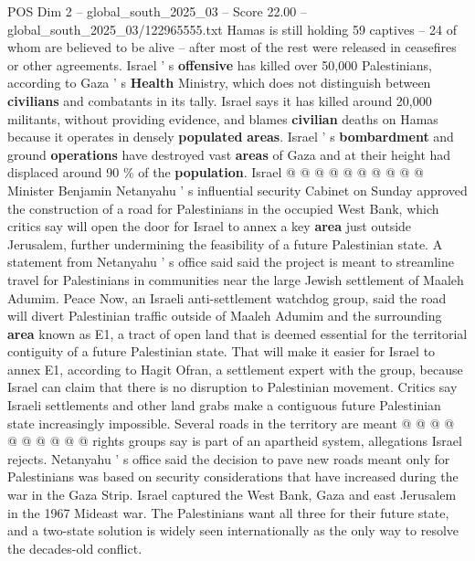\begin{textsample}{POS Dim 2 – global\_south\_2025\_03 – Score 22.00 – global\_south\_2025\_03/122965555.txt}
Hamas is still holding 59 captives -- 24 of whom are believed to be alive -- after most of the rest were released in ceasefires or other agreements.
Israel ' s \textbf{offensive} has killed over 50,000 Palestinians, according to Gaza ' s \textbf{Health} Ministry, which does not distinguish between \textbf{civilians} and combatants in its tally.
Israel says it has killed around 20,000 militants, without providing evidence, and blames \textbf{civilian} deaths on Hamas because it operates in densely \textbf{populated} \textbf{areas}.
Israel ' s \textbf{bombardment} and ground \textbf{operations} have destroyed vast \textbf{areas} of Gaza and at their height had displaced around 90 \% of the \textbf{population}.
Israel @ @ @ @ @ @ @ @ @ @ Minister Benjamin Netanyahu ' s influential security Cabinet on Sunday approved the construction of a road for Palestinians in the occupied West Bank, which critics say will open the door for Israel to annex a key \textbf{area} just outside Jerusalem, further undermining the feasibility of a future Palestinian state.
A statement from Netanyahu ' s office said said the project is meant to streamline travel for Palestinians in communities near the large Jewish settlement of Maaleh Adumim.
Peace Now, an Israeli anti-settlement watchdog group, said the road will divert Palestinian traffic outside of Maaleh Adumim and the surrounding \textbf{area} known as E1, a tract of open land that is deemed essential for the territorial contiguity of a future Palestinian state.
That will make it easier for Israel to annex E1, according to Hagit Ofran, a settlement expert with the group, because Israel can claim that there is no disruption to Palestinian movement.
Critics say Israeli settlements and other land grabs make a contiguous future Palestinian state increasingly impossible.
Several roads in the territory are meant @ @ @ @ @ @ @ @ @ @ rights groups say is part of an apartheid system, allegations Israel rejects.
Netanyahu ' s office said the decision to pave new roads meant only for Palestinians was based on security considerations that have increased during the war in the Gaza Strip.
Israel captured the West Bank, Gaza and east Jerusalem in the 1967 Mideast war.
The Palestinians want all three for their future state, and a two-state solution is widely seen internationally as the only way to resolve the decades-old conflict.

\end{textsample}

